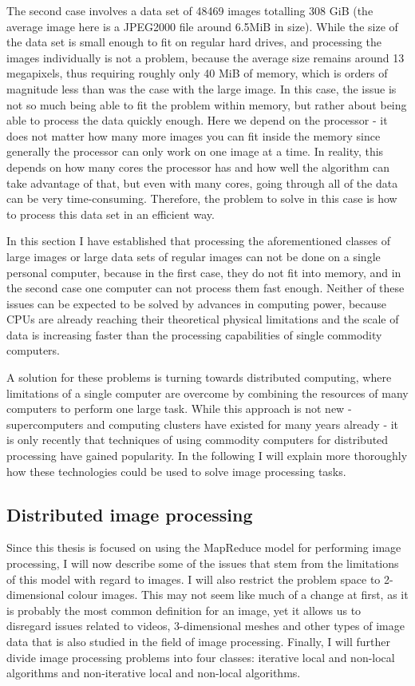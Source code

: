 \documentclass [12pt,a4paper]{report}
\begin{document}
The second case involves a data set of 48469 images totalling 308 GiB (the average image here is a JPEG2000 file around 6.5MiB in size). While the size of the data set is small enough to fit on regular hard drives, and processing the images individually is not a problem, because the average size remains around 13 megapixels, thus requiring roughly only 40 MiB of memory, which is orders of magnitude less than was the case with the large image. In this case, the issue is not so much being able to fit the problem within memory, but rather about being able to process the data quickly enough. Here we depend on the processor - it does not matter how many more images you can fit inside the memory since generally the processor can only work on one image at a time. In reality, this depends on how many cores the processor has and how well the algorithm can take advantage of that, but even with many cores, going through all of the data can be very time-consuming. Therefore, the problem to solve in this case is how to process this data set in an efficient way.

In this section I have established that processing the aforementioned classes of large images or large data sets of regular images can not be done on a single personal computer, because in the first case, they do not fit into memory, and in the second case one computer can not process them fast enough. Neither of these issues can be expected to be solved by advances in computing power, because CPUs are already reaching their theoretical physical limitations  and the scale of data is increasing faster than the processing capabilities of single commodity computers. 

A solution for these problems is turning towards distributed computing, where limitations of a single computer are overcome by combining the resources of many computers to perform one large task. While this approach is not new - supercomputers and computing clusters have existed for many years already - it is only recently that techniques of using commodity computers for distributed processing have gained popularity. In the following I will explain more thoroughly how these technologies could be used to solve image processing tasks.

\subsection{Distributed image processing}

Since this thesis is focused on using the MapReduce model for performing image processing, I will now describe some of the issues that stem from the limitations of this model with regard to images. I will also restrict the problem space to 2-dimensional colour images. This may not seem like much of a change at first, as it is probably the most common definition for an image, yet it allows us to disregard issues related to videos, 3-dimensional meshes and other types of image data that is also studied in the field of image processing. Finally, I will further divide image processing problems into four classes: iterative local and non-local algorithms and non-iterative local and non-local algorithms.
\end{document}
